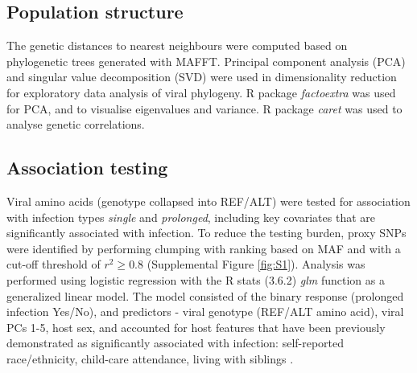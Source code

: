 \documentclass{article} %
\begin{document}
\subsection{Population structure}
The genetic distances to nearest neighbours were computed based on phylogenetic 
trees generated with MAFFT.
Principal component analysis (PCA) and singular value decomposition (SVD) were used in dimensionality reduction for exploratory data analysis of viral phylogeny.
R package \textit{factoextra} was used for PCA, and to visualise eigenvalues and variance. 
R package \textit{caret} was used to analyse genetic correlations.

\subsection{Association testing}
Viral amino acids (genotype collapsed into REF/ALT) were tested for association with infection types \textit{single} and \textit{prolonged}, 
including key covariates that are significantly associated with infection.
To reduce the testing burden, proxy SNPs were identified by
performing clumping with ranking based on MAF and with a cut-off threshold of $r^2 \ge 0.8$ 
(Supplemental Figure \ref{fig:S1}).
Analysis was performed using logistic regression with the
R stats (3.6.2) \textit{glm} function as a generalized linear model.
The model consisted of the binary response (prolonged infection Yes/No), and predictors - viral genotype (REF/ALT amino acid), viral PCs 1-5, host sex, and accounted for host features that have been previously demonstrated as significantly associated with infection: 
self-reported race/ethnicity, child-care attendance, living with siblings 
\citep{rosas2022upper}.

\end{document}
